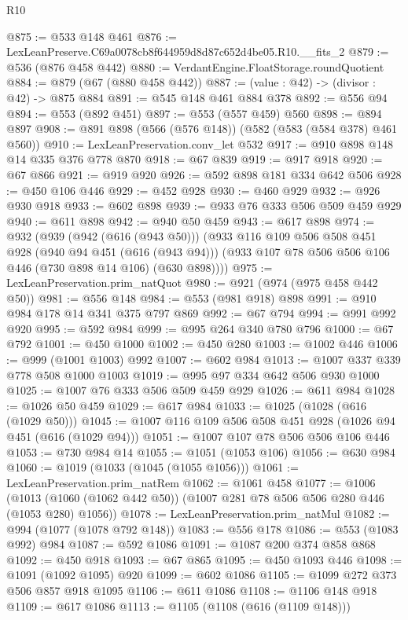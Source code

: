 \begin{lexlean}{R10}
\begin{coremodule}
@875 := @533 @148 @461
@876 := LexLeanPreserve.C69a0078cb8f644959d8d87c652d4be05.R10.__fits_2
@879 := @536 (@876 @458 @442)
@880 := VerdantEngine.FloatStorage.roundQuotient
@884 := @879 (@67 (@880 @458 @442))
@887 := (value : @42) -> (divisor : @42) -> @875 @884
@891 := @545 @148 @461 @884 @378
@892 := @556 @94
@894 := @553 (@892 @451)
@897 := @553 (@557 @459) @560
@898 := @894 @897
@908 := @891 @898 (@566 (@576 @148)) (@582 (@583 (@584 @378) @461 @560))
@910 := LexLeanPreservation.conv_let @532
@917 := @910 @898 @148 @14 @335 @376 @778 @870
@918 := @67 @839
@919 := @917 @918
@920 := @67 @866
@921 := @919 @920
@926 := @592 @898 @181 @334 @642 @506
@928 := @450 @106 @446
@929 := @452 @928
@930 := @460 @929
@932 := @926 @930 @918
@933 := @602 @898
@939 := @933 @76 @333 @506 @509 @459 @929
@940 := @611 @898
@942 := @940 @50 @459
@943 := @617 @898
@974 := @932
    (@939
      (@942 (@616 (@943 @50)))
      (@933
        @116
        @109
        @506
        @508
        @451
        @928
        (@940 @94 @451 (@616 (@943 @94)))
        (@933 @107 @78 @506 @506 @106 @446 (@730 @898 @14 @106) (@630 @898))))
@975 := LexLeanPreservation.prim_natQuot
@980 := @921 (@974 (@975 @458 @442 @50))
@981 := @556 @148
@984 := @553 (@981 @918) @898
@991 := @910 @984 @178 @14 @341 @375 @797 @869
@992 := @67 @794
@994 := @991 @992 @920
@995 := @592 @984
@999 := @995 @264 @340 @780 @796
@1000 := @67 @792
@1001 := @450 @1000
@1002 := @450 @280
@1003 := @1002 @446
@1006 := @999 (@1001 @1003) @992
@1007 := @602 @984
@1013 := @1007 @337 @339 @778 @508 @1000 @1003
@1019 := @995 @97 @334 @642 @506 @930 @1000
@1025 := @1007 @76 @333 @506 @509 @459 @929
@1026 := @611 @984
@1028 := @1026 @50 @459
@1029 := @617 @984
@1033 := @1025 (@1028 (@616 (@1029 @50)))
@1045 := @1007 @116 @109 @506 @508 @451 @928 (@1026 @94 @451 (@616 (@1029 @94)))
@1051 := @1007 @107 @78 @506 @506 @106 @446
@1053 := @730 @984 @14
@1055 := @1051 (@1053 @106)
@1056 := @630 @984
@1060 := @1019 (@1033 (@1045 (@1055 @1056)))
@1061 := LexLeanPreservation.prim_natRem
@1062 := @1061 @458
@1077 := @1006
    (@1013 (@1060 (@1062 @442 @50)) (@1007 @281 @78 @506 @506 @280 @446 (@1053 @280) @1056))
@1078 := LexLeanPreservation.prim_natMul
@1082 := @994 (@1077 (@1078 @792 @148))
@1083 := @556 @178
@1086 := @553 (@1083 @992) @984
@1087 := @592 @1086
@1091 := @1087 @200 @374 @858 @868
@1092 := @450 @918
@1093 := @67 @865
@1095 := @450 @1093 @446
@1098 := @1091 (@1092 @1095) @920
@1099 := @602 @1086
@1105 := @1099 @272 @373 @506 @857 @918 @1095
@1106 := @611 @1086
@1108 := @1106 @148 @918
@1109 := @617 @1086
@1113 := @1105 (@1108 (@616 (@1109 @148)))

\end{coremodule}
\end{lexlean}
